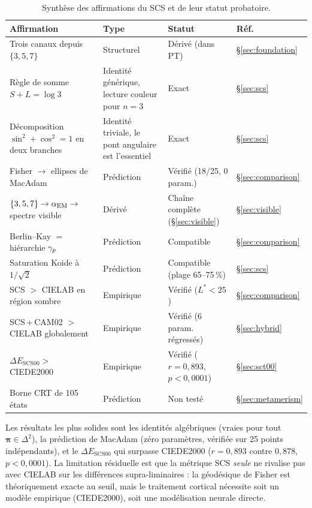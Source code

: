 \documentclass[12pt,a4paper]{article}
\begin{document}
\begin{table}[ht]
\centering
\caption{Synth\`ese des affirmations du SCS et de leur statut probatoire.}
\label{tab:claims}
\begin{tabular}{llll}
\toprule
\textbf{Affirmation} & \textbf{Type} & \textbf{Statut} & \textbf{R\'ef.} \\
\midrule
Trois canaux depuis $\{3,5,7\}$ & Structurel & D\'eriv\'e (dans PT) & \S\ref{sec:foundation} \\
R\`egle de somme $S + L = \log 3$ & Identit\'e g\'en\'erique, lecture couleur pour $n=3$ & Exact & \S\ref{sec:scs} \\
D\'ecomposition $\sin^2 + \cos^2 = 1$ en deux branches & Identit\'e triviale, le pont angulaire est l'essentiel & Exact & \S\ref{sec:scs} \\
Fisher $\to$ ellipses de MacAdam & Pr\'ediction & V\'erifi\'e (18/25, 0 param.) & \S\ref{sec:comparison} \\
$\{3,5,7\} \to \alpha_{\mathrm{EM}} \to$ spectre visible & D\'eriv\'e & Cha\^ine compl\`ete (\S\ref{sec:visible}) & \S\ref{sec:visible} \\
Berlin--Kay $=$ hi\'erarchie $\gamma_{p}$ & Pr\'ediction & Compatible & \S\ref{sec:comparison} \\
Saturation Koide \`a $1/\sqrt{2}$ & Pr\'ediction & Compatible (plage 65--75\,\%) & \S\ref{sec:scs} \\
SCS $>$ CIELAB en r\'egion sombre & Empirique & V\'erifi\'e ($L^*<25$) & \S\ref{sec:comparison} \\
SCS\,+\,CAM02 $>$ CIELAB globalement & Empirique & V\'erifi\'e (6 param. r\'egress\'es) & \S\ref{sec:hybrid} \\
$\Delta E_{\mathrm{SCS00}} >$ CIEDE2000 & Empirique & V\'erifi\'e ($r=0{,}893$, $p<0{,}0001$) & \S\ref{sec:sct00} \\
Borne CRT de 105 \'etats & Pr\'ediction & Non test\'e & \S\ref{sec:metamerism} \\
\bottomrule
\end{tabular}
\end{table}

Les r\'esultats les plus solides sont les identit\'es alg\'ebriques
(vraies pour tout $\bm{\pi} \in \Delta^2$), la pr\'ediction de
MacAdam (z\'ero param\`etres, v\'erifi\'ee sur 25 points
ind\'ependants), et le $\Delta E_{\mathrm{SCS00}}$ qui surpasse
CIEDE2000 ($r = 0{,}893$ contre $0{,}878$, $p < 0{,}0001$). La
limitation r\'esiduelle est que la m\'etrique SCS \emph{seule} ne
rivalise pas avec CIELAB sur les diff\'erences supra-liminaires :
la g\'eod\'esique de Fisher est th\'eoriquement exacte au seuil, mais
le traitement cortical n\'ecessite soit un mod\`ele empirique
(CIEDE2000), soit une mod\'elisation neurale directe.
\end{document}

